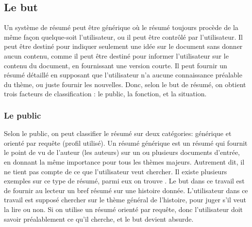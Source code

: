 \documentclass[a4paper,12pt,oneside]{../use/ESIthesis}
\begin{document}
\subsection{Le but}

Un système de résumé peut être générique où le résumé toujours procède de la même façon quelque-soit l'utilisateur, ou il peut être contrôlé par l'utilisateur. 
Il peut être destiné pour indiquer seulement une idée sur le document sans donner aucun contenu, comme il peut être destiné pour informer l'utilisateur sur le contenu du document, en fournissant une version courte.
Il peut fournir un résumé détaillé en supposant que l'utilisateur n'a aucune connaissance préalable du thème, ou juste fournir les nouvelles.
Donc, selon le but de résumé, on obtient trois facteurs de classification : le public, la fonction, et la situation. 

\subsubsection{Le public}

Selon le public, on peut classifier le résumé sur deux catégories: générique et orienté par requête (profil utilisé). 
Un résumé générique est un résumé qui fournit le point de vu de l'auteur (les auteurs) sur un ou plusieurs documents d'entrée, en donnant la même importance pour tous les thèmes majeurs. 
Autrement dit, il ne tient pas compte de ce que l'utilisateur veut chercher. 
Il existe plusieurs exemples sur ce type de résumé, parmi eux on trouve \cite{06-kazantseva}.
Le but dans ce travail est de fournir au lecteur un bref résumé sur une histoire donnée. 
L'utilisateur dans ce travail est supposé chercher sur le thème général de l'histoire, pour juger s'il veut la lire ou non. 
Si on utilise un résumé orienté par requête, donc l'utilisateur doit savoir préalablement ce qu'il cherche, et le but devient absurde. 
\end{document}
